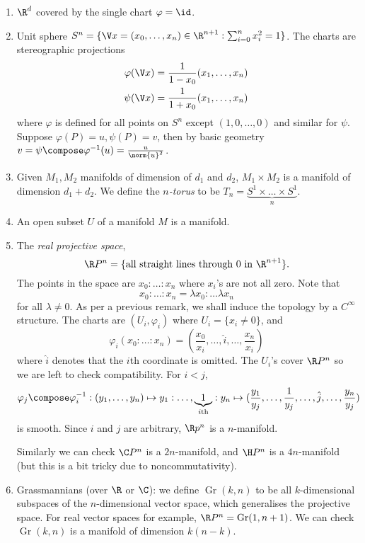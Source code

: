 \documentclass[a4paper]{article}
\DeclareMathOperator{\Gr}{Gr} %
\begin{document}
\begin{eg}\leavevmode
  \begin{enumerate}
  \item \(\R^d\) covered by the single chart \(\varphi = \id\).
  \item Unit sphere \(S^n = \{\V x = (x_0, \dots, x_n) \in \R^{n + 1}: \sum_{i = 0}^n x_i^2 = 1\}\). The charts are stereographic projections
    \begin{align}
      \varphi(\V x) &= \frac{1}{1 - x_0} (x_1, \dots, x_n) \\
      \psi(\V x) &= \frac{1}{1 + x_0} (x_1, \dots, x_n)
    \end{align}
    where \(\varphi\) is defined for all points on \(S^n\) except \((1, 0, \dots, 0)\) and similar for \(\psi\). Suppose \(\varphi(P) = u, \psi(P) = v\), then by basic geometry \(v = \psi \compose \varphi^{-1}(u) = \frac{u}{\norm{u}^2}\).
  \item Given \(M_1, M_2\) manifolds of dimension of \(d_1\) and \(d_2\), \(M_1 \times M_2\) is a manifold of dimension \(d_1 + d_2\). We define the \emph{\(n\)-torus} to be \(T_n = \underbrace{S^1 \times \dots \times S^1}_{n}\).
  \item An open subset \(U\) of a manifold \(M\) is a manifold.
  \item The \emph{real projective space},
    \[
      \R P^n = \{\text{all straight lines through \(0\) in } \R^{n + 1}\}.
    \]
    The points in the space are \(x_0 : \dots : x_n\) where \(x_i\)'s are not all zero. Note that
    \[
      x_0 : \dots : x_n = \lambda x_0 : \dots \lambda x_n
    \]
    for all \(\lambda \neq 0\). As per a previous remark, we shall induce the topology by a \(C^\infty\) structure. The charts are \((U_i, \varphi_i)\) where \(U_i = \{x_i \neq 0\}\), and
    \[
      \varphi_i(x_0 : \dots : x_n) = (\frac{x_0}{x_i}, \dots, \hat i, \dots, \frac{x_n}{x_i})
    \]
    where \(\hat i\) denotes that the \(i\)th coordinate is omitted. The \(U_i\)'s cover \(\R P^n\) so we are left to check compatibility. For \(i < j\),
    \[
      \varphi_j \compose \varphi_i^{-1} : (y_1, \dots, y_n)
      \mapsto y_1 : \dots, \underbrace{1}_{i\text{th}} : y_n
      \mapsto (\frac{y_1}{y_j}, \dots, \frac{1}{y_j}, \dots, \hat j, \dots, \frac{y_n}{y_j})
    \]
    is smooth. Since \(i\) and \(j\) are arbitrary, \(\R p^n\) is a \(n\)-manifold.

    Similarly we can check \(\C P^n\) is a \(2n\)-manifold, and \(\H P^n\) is a \(4n\)-manifold (but this is a bit tricky due to noncommutativity).
  \item Grassmannians (over \(\R\) or \(\C\)): we define \(\Gr(k, n)\) to be all \(k\)-dimensional subspaces of the \(n\)-dimensional vector space, which generalises the projective space. For real vector spaces for example, \(\R P^n = \Gr(1, n + 1)\). We can check \(\Gr(k, n)\) is a manifold of dimension \(k(n - k)\).


\end{enumerate}
\end{eg}
\end{document}
